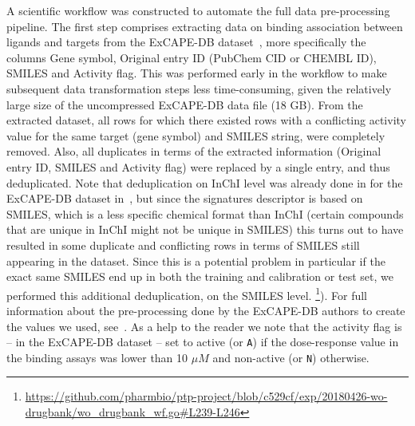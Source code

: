 \documentclass[utf8]{frontiersSCNS} %
\begin{document}
A scientific workflow was constructed to automate the full data
pre-processing pipeline. The first step comprises extracting data on binding
association between ligands and targets from the ExCAPE-DB
dataset~\cite{Sun2017}, more specifically the columns Gene symbol, Original
entry ID (PubChem CID or CHEMBL ID), SMILES and Activity flag. This was
performed early in the workflow to make subsequent data transformation steps
less time-consuming, given the relatively large size of the uncompressed
ExCAPE-DB data file (18 GB). From the extracted dataset, all rows for which
there existed rows with a conflicting activity value for the same target
(gene symbol) and SMILES string, were completely removed. Also, all duplicates
in terms of the extracted information (Original entry ID, SMILES and Activity flag)
were replaced by a single entry, and thus deduplicated.
%
Note that deduplication on InChI level was already done in for the ExCAPE-DB
dataset in~\cite{Sun2017}, but since the signatures descriptor is based on
SMILES, which is a less specific chemical format than InChI (certain
compounds that are unique in InChI might not be unique in SMILES) this turns
out to have resulted in some duplicate and conflicting rows in terms of
SMILES still appearing in the dataset. Since this is a potential problem in
particular if the exact same SMILES end up in both the training and
calibration or test set, we performed this additional deduplication, on the
SMILES level.
\footnote{\url{https://github.com/pharmbio/ptp-project/blob/c529cf/exp/20180426-wo-drugbank/wo\_drugbank\_wf.go\#L239-L246}}).
%
For full information about the pre-processing done by the ExCAPE-DB authors to
create the values we used, see~\cite{Sun2017}. As a help to the reader we
note that the activity flag is -- in the ExCAPE-DB dataset -- set to active
(or \texttt{A}) if the dose-response value in the binding assays was lower
than 10 ${\mu}M$ and non-active (or \texttt{N}) otherwise.
\end{document}
